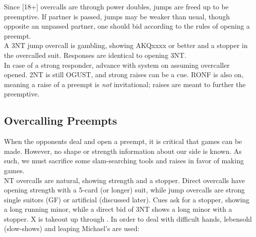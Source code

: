 \documentclass[12pt]{report}
\newcommand{\n}{\\}
\begin{document}
    Since [18+] overcalls are through power doubles, jumps are freed up to be preemptive.  If partner is passed, jumps may be weaker than usual, though opposite an unpassed partner, one should bid according to the rules of opening a preempt. \n

    A 3NT jump overcall is gambling, showing AKQxxxx or better and a stopper in the overcalled suit.  Responses are identical to opening 3NT. \n

    In case of a strong responder, advance with system on assuming overcaller opened.  2NT is still OGUST, and strong raises can be a cue. RONF is also on, meaning a raise of a preempt is \textit{not} invitational; raises are meant to further the preemptive.

\subsection{Overcalling Preempts}

    When the opponents deal and open a preempt, it is critical that games can be made.  However, no shape or strength information about our side is known.  As such, we must sacrifice some slam-searching tools and raises in favor of making games. \n

    NT overcalls are natural, showing strength and a stopper.  Direct overcalls have opening strength with a 5-card (or longer) suit, while jump overcalls are strong single suitors (GF) or artificial (discussed later).  Cues ask for a stopper, showing a long running minor, while a direct bid of 3NT shows a long minor with a stopper. X is takeout up through .  In order to deal with difficult hands, lebensohl (slow-shows) and leaping Michael's are used:
\end{document}
